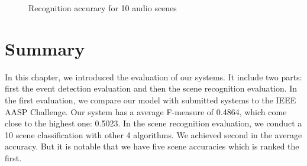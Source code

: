 \begin{table}[htb!]
\centering
{}
\caption{Recognition accuracy for 10 audio scenes}
\label{table:ac}
\end{table}

\begin{figure}[htb]
\centering

\caption{Recognition accuracy for 10 audio scenes}
\label{fig:sceneeval}
\end{figure}

\section{Summary}
In this chapter, we introduced the evaluation of our systems. 
It include two parts: first the event detection evaluation and then the scene recognition evaluation.
In the first evaluation, we compare our model with submitted systems to the IEEE AASP Challenge. 
Our system has a average F-measure of 0.4864, which come close to the highest one: 0.5023. 
In the scene recognition evaluation, we conduct a 10 scene classification with other 4 algorithms. 
We achieved second in the average accuracy. 
But it is notable that we have five scene accuracies which is ranked the first.  
